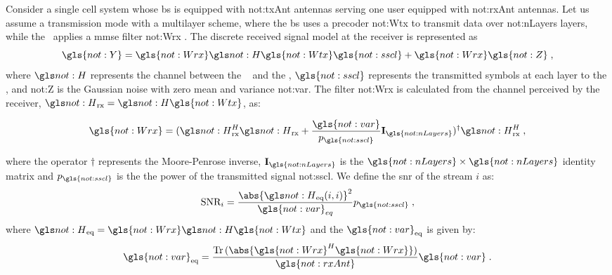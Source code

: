 Consider a single cell system whose \gls{bs} is equipped with \gls{not:txAnt} antennas serving one user equipped with \gls{not:rxAnt} antennas.
%
Let us assume a transmission mode with a multilayer scheme, where the \gls{bs} uses a precoder \gls{not:Wtx}  to transmit data over  \gls{not:nLayers} layers, while the \ue~applies a \gls{mmse} filter \gls{not:Wrx} .
%
The discrete received signal model at the receiver is represented as
\begin{equation}
\label{eq.:rx_signal}
\gls{not:Y} =
\gls{not:Wrx}
\channel
\gls{not:Wtx}
\gls{not:sscl}
+
\gls{not:Wrx}
\gls{not:Z} \;,
\end{equation}
\noindent where $\channel $  represents the channel between the \bs~ and the \ue, $\gls{not:sscl}$ represents the transmitted symbols at each layer to the \ue, and \gls{not:Z} is the Gaussian noise with zero mean and variance \gls{not:var}.
%
The filter \gls{not:Wrx} is calculated from the channel perceived by the receiver, $\channel_{\textrm{rx}} = \channel \gls{not:Wtx}$, as:

\begin{equation}
\label{eq.:Wrx}
\gls{not:Wrx} =
(
\channel_{\textrm{rx}}^H
\channel_{\textrm{rx}}
+
\frac{ \gls{not:var} }{ p_{\gls{not:sscl}} }
\mathbf{I}_{\gls{not:nLayers}} )^\dagger
\channel_{\textrm{rx}}^H \;,
\end{equation}

\noindent where the operator $\dagger$ represents the Moore-Penrose inverse, $\mathbf{ I}_{\gls{not:nLayers}} $ is the $\gls{not:nLayers} \times \gls{not:nLayers}$ identity matrix and $p_{\gls{not:sscl}}$ is the the power of the transmitted signal \gls{not:sscl}.
%
We define the \gls{snr} of the stream $i$ as:
%
\begin{equation}
\label{eq.:snr}
\textrm{SNR}_i = \frac{ \abs{
		\channel_{\textrm{eq}} (i,i)
	}^2 }{\gls{not:var}_{eq}} p_{\gls{not:sscl}} \; ,
\end{equation}
%
where $\channel_{\textrm{eq}} = \gls{not:Wrx} \channel \gls{not:Wtx}$ and the $\gls{not:var}_{\textrm{eq}}$ is given by:
%
\begin{equation}
\gls{not:var}_{\textrm{eq}} = \frac{
	\Tr \,  (\abs{ \gls{not:Wrx}^H \gls{not:Wrx} } )}
{\gls{not:rxAnt}}
\gls{not:var} \;.
\end{equation}


